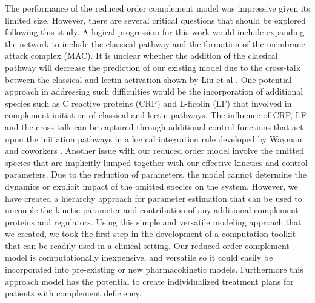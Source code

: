 \documentclass[12pt]{article}
\begin{document}
The performance of the reduced order complement model was impressive given its limited size. However, there are several critical questions that should be explored following this study. A logical progression for this work would include expanding the network to include the classical pathway and the formation of the membrane attack complex (MAC). It is unclear whether the addition of the classical pathway will decrease the prediction of our existing model due to the cross-talk between the classical and lectin activation shown by Liu et al \cite{liu2011computational}. One potential approach in addressing such difficulties would be the incorporation of additional species such as C reactive proteins (CRP) and L-ficolin (LF) that involved in complement initiation of classical and lectin pathways. The influence of CRP, LF and the cross-talk can be captured through additional control functions that act upon the initiation pathways in a logical integration rule developed by Wayman and coworkers \cite{wayman2015dynamic}. Another issue with our reduced order model involve the omitted species that are implicitly lumped together with our effective kinetics and control parameters. Due to the reduction of parameters, the model cannot determine the dynamics or explicit impact of the omitted species on the system. However, we have created a hierarchy approach for parameter estimation that can be used to uncouple the kinetic parameter and contribution of any additional complement proteins and regulators. Using this simple and versatile modeling approach that we created, we took the first step in the development of a computation toolkit that can be readily used in a clinical setting. Our reduced order complement model is computationally inexpensive, and versatile so it could easily be incorporated into pre-existing or new pharmacokinetic models. Furthermore this approach model has the potential to create individualized treatment plans for patients with complement deficiency.

\clearpage
\end{document}
